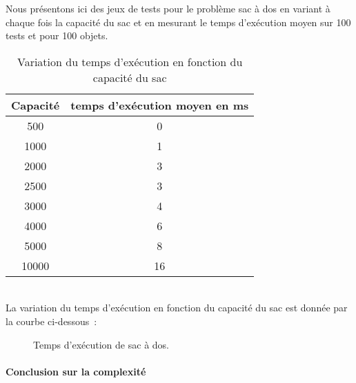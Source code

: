 Nous présentons ici des jeux de tests pour le problème sac à dos en variant à chaque fois la capacité du sac et en mesurant le temps d'exécution moyen sur 100 tests et pour 100 objets.
\begin{table}[h!]
\centering
\begin{tabular}{|c|c|}
\hline
Capacité & temps d'exécution moyen en ms\\
\hline
500 & 0\\
\hline
1000 & 1\\
\hline
2000 & 3\\
\hline
2500 & 3\\
\hline
3000 & 4\\
\hline
4000 & 6\\
\hline
5000 & 8\\
\hline
10000 & 16\\
\hline
\end{tabular}
\caption {Variation du temps d'exécution en fonction du capacité du sac}
\end{table}\\
La variation du temps d'exécution en fonction du capacité du sac est donnée par la courbe ci-dessous~:
\begin{figure}[h!]
\centering
{}
\caption{Temps d'exécution de sac à dos.}
\end{figure}

\paragraph{Conclusion sur la complexité}

